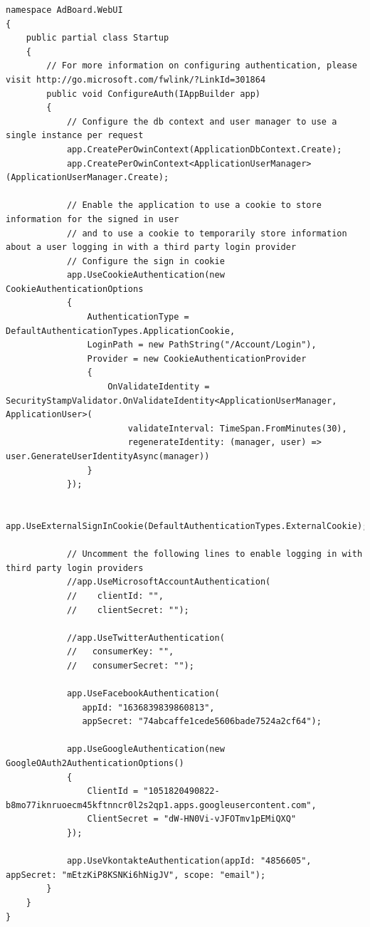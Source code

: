 \documentclass[14pt,a4paper]{extreport}
\begin{document}
\begin{lstlisting}
namespace AdBoard.WebUI
{
    public partial class Startup
    {
        // For more information on configuring authentication, please visit http://go.microsoft.com/fwlink/?LinkId=301864
        public void ConfigureAuth(IAppBuilder app)
        {
            // Configure the db context and user manager to use a single instance per request
            app.CreatePerOwinContext(ApplicationDbContext.Create);
            app.CreatePerOwinContext<ApplicationUserManager>(ApplicationUserManager.Create);

            // Enable the application to use a cookie to store information for the signed in user
            // and to use a cookie to temporarily store information about a user logging in with a third party login provider
            // Configure the sign in cookie
            app.UseCookieAuthentication(new CookieAuthenticationOptions
            {
                AuthenticationType = DefaultAuthenticationTypes.ApplicationCookie,
                LoginPath = new PathString("/Account/Login"),
                Provider = new CookieAuthenticationProvider
                {
                    OnValidateIdentity = SecurityStampValidator.OnValidateIdentity<ApplicationUserManager, ApplicationUser>(
                        validateInterval: TimeSpan.FromMinutes(30),
                        regenerateIdentity: (manager, user) => user.GenerateUserIdentityAsync(manager))
                }
            });
            
            app.UseExternalSignInCookie(DefaultAuthenticationTypes.ExternalCookie);

            // Uncomment the following lines to enable logging in with third party login providers
            //app.UseMicrosoftAccountAuthentication(
            //    clientId: "",
            //    clientSecret: "");

            //app.UseTwitterAuthentication(
            //   consumerKey: "",
            //   consumerSecret: "");

            app.UseFacebookAuthentication(
               appId: "1636839839860813",
               appSecret: "74abcaffe1cede5606bade7524a2cf64");

            app.UseGoogleAuthentication(new GoogleOAuth2AuthenticationOptions()
            {
                ClientId = "1051820490822-b8mo77iknruoecm45kftnncr0l2s2qp1.apps.googleusercontent.com",
                ClientSecret = "dW-HN0Vi-vJFOTmv1pEMiQXQ"
            });

            app.UseVkontakteAuthentication(appId: "4856605", appSecret: "mEtzKiP8KSNKi6hNigJV", scope: "email");
        }
    }
}


\end{lstlisting}
\end{document}
